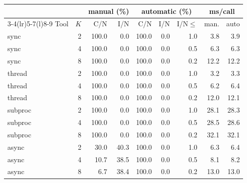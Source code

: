 \begin{tabular}{@{}lrrrrrrrr@{}}
\toprule
 & & \multicolumn{2}{c}{manual (\%)} & \multicolumn{3}{c}{automatic (\%)} & \multicolumn{2}{c}{ms/call} \\
\cmidrule(lr){3-4}\cmidrule(lr){5-7}\cmidrule(l){8-9}
Tool & $K$ & C/N & I/N & C/N & I/N & I/N$\le$ & man. & auto \\
\midrule
sync & 2 & 100.0 & 0.0 & 100.0 & 0.0 & 1.0 & 3.8 & 3.9 \\
sync & 4 & 100.0 & 0.0 & 100.0 & 0.0 & 0.5 & 6.3 & 6.3 \\
sync & 8 & 100.0 & 0.0 & 100.0 & 0.0 & 0.2 & 12.2 & 12.2 \\
thread & 2 & 100.0 & 0.0 & 100.0 & 0.0 & 1.0 & 3.2 & 3.3 \\
thread & 4 & 100.0 & 0.0 & 100.0 & 0.0 & 0.5 & 6.2 & 6.4 \\
thread & 8 & 100.0 & 0.0 & 100.0 & 0.0 & 0.2 & 12.0 & 12.1 \\
subproc & 2 & 100.0 & 0.0 & 100.0 & 0.0 & 1.0 & 28.1 & 28.3 \\
subproc & 4 & 100.0 & 0.0 & 100.0 & 0.0 & 0.5 & 28.5 & 28.6 \\
subproc & 8 & 100.0 & 0.0 & 100.0 & 0.0 & 0.2 & 32.1 & 32.1 \\
async & 2 & 30.0 & 40.3 & 100.0 & 0.0 & 1.0 & 6.3 & 6.4 \\
async & 4 & 10.7 & 38.5 & 100.0 & 0.0 & 0.5 & 8.1 & 8.2 \\
async & 8 & 6.7 & 38.4 & 100.0 & 0.0 & 0.2 & 13.0 & 13.0 \\
\bottomrule
\end{tabular}
